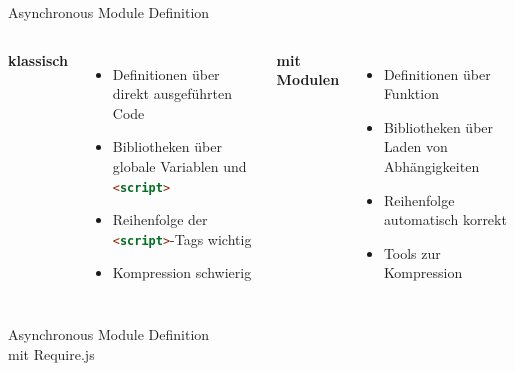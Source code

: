 \begin{frame}{Asynchronous Module Definition}
  \begin{columns}
    {\large\bfseries\color{maincolor}klassisch}
    \begin{itemize}
      \item Definitionen über direkt ausgeführten Code
      \item Bibliotheken über globale Variablen und \lstinline[language=HTML]-<script>-
      \item Reihenfolge der \lstinline[language=HTML]-<script>--Tags wichtig
      \item Kompression schwierig
    \end{itemize}
    {\large\bfseries\color{maincolor}mit Modulen}
    \begin{itemize}
      \item Definitionen über Funktion
      \item Bibliotheken über Laden von Abhängigkeiten
      \item Reihenfolge automatisch korrekt
      \item Tools zur Kompression
    \end{itemize}
  \end{columns}
\end{frame}

\begin{frame}{Asynchronous Module Definition\\ mit Require.js}
  \begin{center}
    
  \end{center}
\end{frame}

\lstset{basicstyle=\ttfamily\scriptsize}


